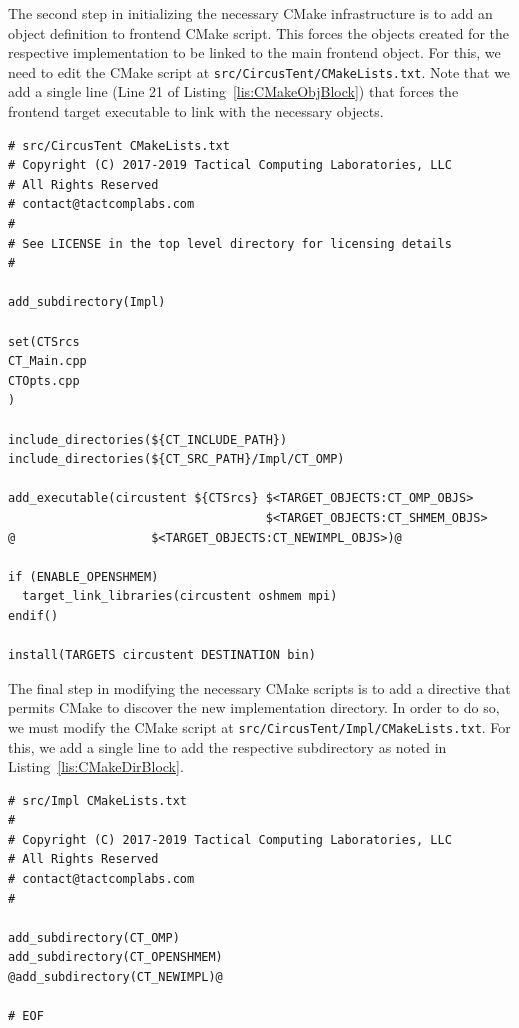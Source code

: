 \documentclass{article}
\begin{document}
The second step in initializing the necessary CMake infrastructure is to add 
an object definition to frontend CMake script.  This forces the objects created for the 
respective implementation to be linked to the main frontend object.  For this, 
we need to edit the CMake script at \texttt{src/CircusTent/CMakeLists.txt}.  Note that 
we add a single line (Line 21 of Listing~\ref{lis:CMakeObjBlock}) that forces the 
frontend target executable to link with the necessary objects.  

\clearpage
\vspace{0.125in}
\begin{lstlisting}[frame=single,style=base,caption={CMake Object Block},captionpos=b,label={lis:CMakeObjBlock}]
# src/CircusTent CMakeLists.txt
# Copyright (C) 2017-2019 Tactical Computing Laboratories, LLC
# All Rights Reserved
# contact@tactcomplabs.com
#
# See LICENSE in the top level directory for licensing details
#

add_subdirectory(Impl)

set(CTSrcs
CT_Main.cpp
CTOpts.cpp
)

include_directories(${CT_INCLUDE_PATH})
include_directories(${CT_SRC_PATH}/Impl/CT_OMP)

add_executable(circustent ${CTSrcs} $<TARGET_OBJECTS:CT_OMP_OBJS>
                                    $<TARGET_OBJECTS:CT_SHMEM_OBJS>
@				    $<TARGET_OBJECTS:CT_NEWIMPL_OBJS>)@

if (ENABLE_OPENSHMEM)
  target_link_libraries(circustent oshmem mpi)
endif()

install(TARGETS circustent DESTINATION bin)
\end{lstlisting}

The final step in modifying the necessary CMake scripts is to add a directive 
that permits CMake to discover the new implementation directory.  
In order to do so, we must modify the CMake script at 
\texttt{src/CircusTent/Impl/CMakeLists.txt}.  For this, we add a single line 
to add the respective subdirectory as noted in Listing~\ref{lis:CMakeDirBlock}.  

\vspace{0.125in}
\begin{lstlisting}[frame=single,style=base,caption={CMake Subdirectory Block},captionpos=b,label={lis:CMakeDirBlock}]
# src/Impl CMakeLists.txt
#
# Copyright (C) 2017-2019 Tactical Computing Laboratories, LLC
# All Rights Reserved
# contact@tactcomplabs.com
#

add_subdirectory(CT_OMP)
add_subdirectory(CT_OPENSHMEM)
@add_subdirectory(CT_NEWIMPL)@

# EOF
\end{lstlisting}
\end{document}
